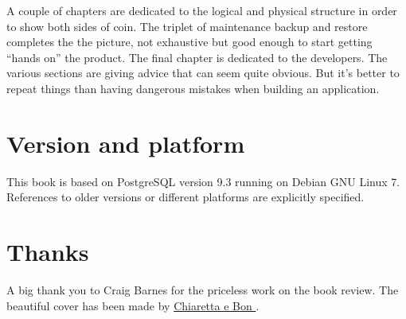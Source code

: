 \documentclass[oneside]{book}
\begin{document}
A couple of chapters are dedicated to the logical and physical structure in
order to show both sides of coin.  The triplet of maintenance backup and restore completes the 
the picture, not exhaustive but good enough to start getting ``hands on'' the product.
The final chapter is dedicated to the developers. The various sections are 
giving advice that can seem quite obvious. But it's better to repeat things than having dangerous 
mistakes when building an application. 

\chapter*{Version and platform}
This book is based on PostgreSQL version 9.3 running on Debian GNU Linux 7.
References to older versions or different platforms are explicitly specified.

\chapter*{Thanks}
A big thank you to Craig Barnes for the priceless work on the book review.\newline
The beautiful cover has been made by \href{http://www.bonland.eu/}{
Chiaretta e Bon }.\newline













\appendix



\listoffigures
\listoftables
\printindex{}
\end{document}
